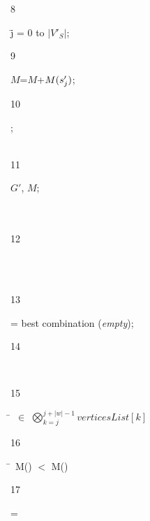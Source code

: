 \begin{figure}[!t]
\begin{tabbing}
                    \begin{redtext}8\end{redtext} \= j = 0 to $|V'_S|$;\\
                    \begin{redtext}9\end{redtext}\tabone $M$=$M$+$M(s'_{j})$;\\
                    \begin{redtext}10\end{redtext};\\
                    \\
                    \begin{redtext}11\end{redtext}  $G'$, $M$;\\
                    \\
                    \\
                    \begin{redtext}12\end{redtext}\\
                    \\
                    \begin{redtext}13\end{redtext}\bestcombination = best combination (\textit{empty});\\
                    \begin{redtext}14\end{redtext}\\
                    \begin{redtext}15\end{redtext}\=~\currentcombination $\in$  $\bigotimes_{k=j}^{j+|w|-1} verticesList[k]$\\
                    \begin{redtext}16\end{redtext}\tabone {}\=~M(\currentcombination) $<$ M(\bestcombination)\\
                    \begin{redtext}17\end{redtext}\tabtwo \bestcombination = \currentcombination\\


\end{tabbing}
\end{figure}
